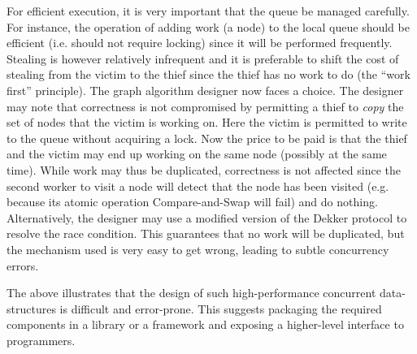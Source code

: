 For efficient execution, it is very important that the queue be
managed carefully. For instance, the operation of adding work (a node)
to the local queue should be efficient (i.e.{} should not require
locking) since it will be performed frequently. Stealing is however
relatively infrequent and it is preferable to shift the cost of
stealing from the victim to the thief since the thief has no work to
do (the ``work first'' principle). The graph algorithm designer now
faces a choice. The designer may note \cite{BC04a} that correctness is
not compromised by permitting a thief to {\em copy} the set of nodes
that the victim is working on. Here the victim is permitted to write
to the queue without acquiring a lock. Now the price to be paid is
that the thief and the victim may end up working on the same node
(possibly at the same time).  While work may thus be duplicated,
correctness is not affected since the second worker to visit a node
will detect that the node has been visited (e.g.{} because its atomic
operation Compare-and-Swap will fail) and do nothing. Alternatively, the designer may
use a modified version of the Dekker protocol \cite{BJKLRZ95} to resolve the race condition. 
This guarantees that no work will be duplicated, but the mechanism used is very easy to get wrong, leading to subtle concurrency errors.

The above illustrates that the design of such high-performance
concurrent data-structures is difficult and error-prone. 
This suggests packaging the required components in a library or a framework and
exposing a higher-level interface to programmers.

